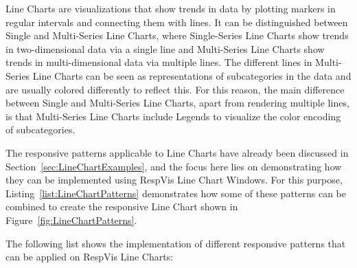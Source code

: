 Line Charts are visualizations that show trends in data by plotting markers in regular intervals and connecting them with lines.
It can be distinguished between Single and Multi-Series Line Charts, where Single-Series Line Charts show trends in two-dimensional data via a single line and Multi-Series Line Charts show trends in multi-dimensional data via multiple lines. 
The different lines in Multi-Series Line Charts can be seen as representations of subcategories in the data and are usually colored differently to reflect this.
For this reason, the main difference between Single and Multi-Series Line Charts, apart from rendering multiple lines, is that Multi-Series Line Charts include Legends to visualize the color encoding of subcategories.

The responsive patterns applicable to Line Charts have already been discussed in Section~\ref{sec:LineChartExamples}, and the focus here lies on demonstrating how they can be implemented using RespVis Line Chart Windows. 
For this purpose, Listing~\ref{list:LineChartPatterns} demonstrates how some of these patterns can be combined to create the responsive Line Chart shown in Figure~\ref{fig:LineChartPatterns}.

The following list shows the implementation of different responsive patterns that can be applied on RespVis Line Charts:

